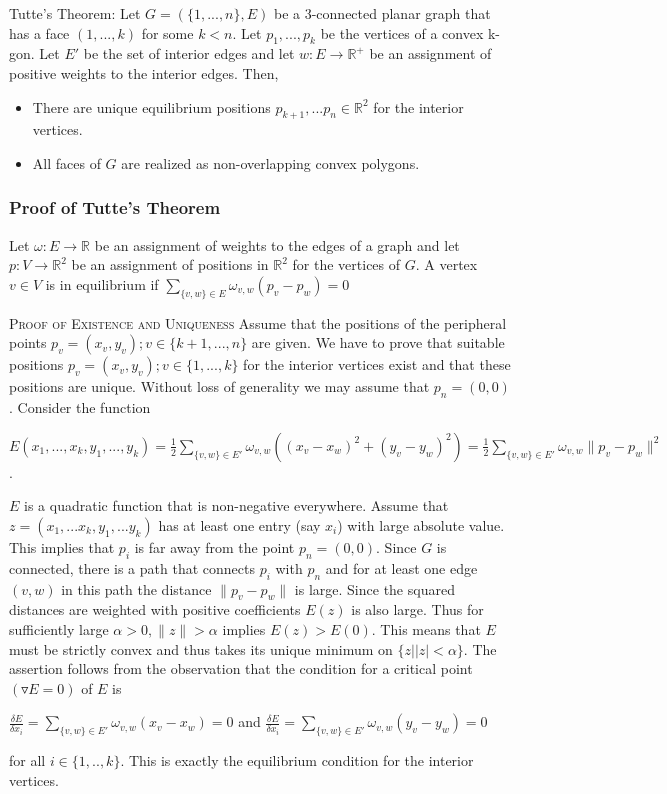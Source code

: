 \documentclass[11pt]{article}
\newcommand{\R}{\mathbb{R}}
\begin{document}
 Tutte's Theorem: Let $G = (\{1,...,n\},E)$ be a 3-connected planar graph that has a face $(1,...,k)$ for some $k<n$. Let $p_1,...,p_k$ be the vertices of a convex k-gon. Let $E'$ be the set of interior edges and let $w : E \rightarrow \R^+$ be an assignment of positive weights to the interior edges. Then,
 	\begin{itemize}
		\item There are unique equilibrium positions $p_{k+1}, ...p_n \in \R^2$ for the interior vertices. 
		\item All faces of $G$ are realized as non-overlapping convex polygons.
	\end{itemize}
	
	
\subsubsection{Proof of Tutte's Theorem}
Let $\omega : E \rightarrow \R$ be an assignment of weights to the edges of a graph and let $p:V \rightarrow \R^2$ be an assignment of positions in $\R^2$ for the vertices of $G$. A vertex $v \in V$ is in equilibrium if  $\sum\limits_{\{v,w\} \in E} \omega_{v,w}(p_v - p_w) = 0$

\textsc {Proof of Existence and Uniqueness}  Assume that the positions of the peripheral points $p_v = (x_v,y_v); v \in \{k+1,...,n\}$ are given. We have to prove that suitable positions $p_v = (x_v,y_v); v \in \{1,...,k\}$ for the interior vertices exist and that these positions are unique. Without loss of generality we may assume that $p_n = (0,0)$. Consider the function
\begin{center}
$E(x_1,...,x_k,y_1,...,y_k) = \frac{1}{2} \sum\limits_{\{v,w\} \in E'} \omega_{v,w}((x_v - x_w)^2 + (y_v - y_w)^2) 
= \frac{1}{2} \sum\limits_{\{v,w\} \in E'} \omega_{v,w} \|p_v - p_w\|^2$. \\
\end{center}
$E$ is a quadratic function that is non-negative everywhere. Assume that $z=(x_1,...x_k,y_1,...y_k)$ has at least one entry (say $x_i$) with large absolute value. This implies that $p_i$ is far away from the point $p_n = (0,0)$. Since $G$ is connected, there is a path that connects $p_i$ with $p_n$ and for at least one edge $(v,w)$ in this path the distance $\|p_v - p_w\|$ is large. Since the squared distances are weighted with positive coefficients $E(z)$ is also large. Thus for sufficiently large $\alpha > 0, \|z\| > \alpha$ implies $E(z) > E(0)$. This means that $E$ must be strictly convex and thus takes its unique minimum on $\{z | |z| < \alpha \}$. The assertion follows from the observation that the condition for a critical point $(\triangledown E = 0)$ of $E$ is
\begin{center}
$\frac{\delta E}{\delta x_i} = \sum\limits_{\{v,w\} \in E'} \omega_{v,w}(x_v - x_w) = 0$ and $\frac{\delta E}{\delta x_i} = \sum\limits_{\{v,w\} \in E'} \omega_{v,w}(y_v - y_w) = 0$
\end{center}
for all $i \in \{1,..,k\}$. This is exactly the equilibrium condition for the interior vertices.
\end{document}
